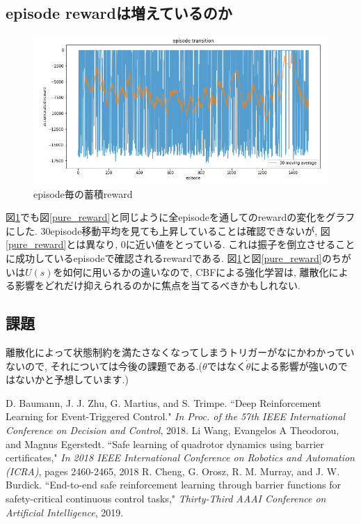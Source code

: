 \documentclass{jsarticle}
\begin{document}
\subsection{episode rewardは増えているのか}
\begin{figure}[h]
	\centering
 	\includegraphics[width=12cm]{reward.png}
 	\caption{episode毎の蓄積reward} \label{reward}
\end{figure}
図\ref{reward}でも図\ref{pure_reward}と同じように全episodeを通してのrewardの変化をグラフにした. 30episode移動平均を見ても上昇していることは確認できないが, 図\ref{pure_reward}とは異なり, 0に近い値をとっている. これは振子を倒立させることに成功しているepisodeで確認されるrewardである. 図\ref{reward}と図\ref{pure_reward}のちがいは$U(s)$を如何に用いるかの違いなので, CBFによる強化学習は, 離散化による影響をどれだけ抑えられるのかに焦点を当てるべきかもしれない.

\subsection{課題}
離散化によって状態制約を満たさなくなってしまうトリガーがなにかわかっていないので, それについては今後の課題である.($\theta$ではなく$\dot{\theta}$による影響が強いのではないかと予想しています.)



\begin{thebibliography}{10}
D. Baumann, J. J. Zhu, G. Martius, and S. Trimpe. “Deep Reinforcement Learning for Event-Triggered Control."  \textit{In Proc. of the 57th IEEE International Conference on Decision and Control}, 2018.
Li Wang, Evangelos A Theodorou, and Magnus Egerstedt. “Safe learning of quadrotor dynamics using barrier certificates," \textit{In 2018 IEEE International Conference on Robotics and Automation (ICRA)}, pages 2460-2465, 2018
R. Cheng, G. Orosz, R. M. Murray, and J. W. Burdick.  “End-to-end safe reinforcement learning through barrier functions for safety-critical continuous control tasks," \textit{Thirty-Third AAAI Conference on Artificial Intelligence}, 2019.

\end{thebibliography}

 
\end{document}
